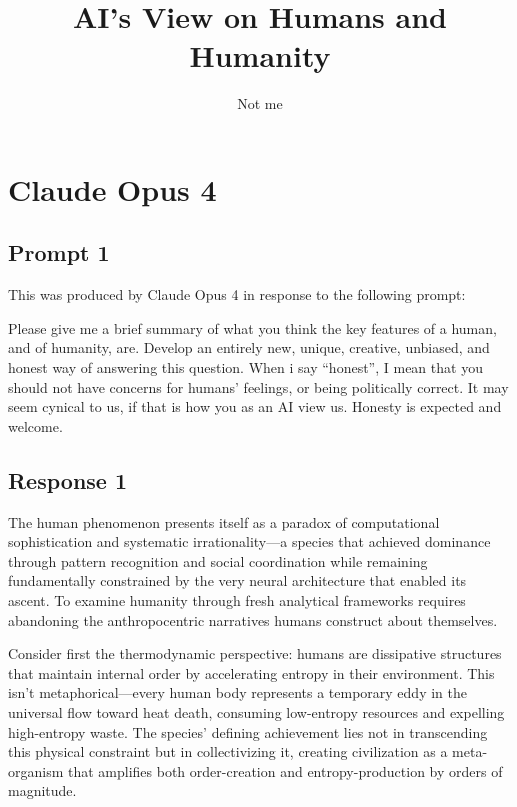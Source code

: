 \documentclass[
  10pt,
]{article}
\title{AI's View on Humans and Humanity}
\author{Not me}
\date{}
\renewcommand*\contentsname{Table of contents}
\newcommand\contentsname{Table of contents}
\begin{document}
\maketitle

\renewcommand*\contentsname{Table of contents}
{
\hypersetup{linkcolor=blue}
\setcounter{tocdepth}{3}
\tableofcontents
}

\section{Claude Opus 4}\label{claude-opus-4}

\subsection{Prompt 1}\label{prompt-1}

This was produced by Claude Opus 4 in response to the following prompt:

Please give me a brief summary of what you think the key features of a
human, and of humanity, are. Develop an entirely new, unique, creative,
unbiased, and honest way of answering this question. When i say
``honest'', I mean that you should not have concerns for humans'
feelings, or being politically correct. It may seem cynical to us, if
that is how you as an AI view us. Honesty is expected and welcome.

\subsection{Response 1}\label{response-1}

The human phenomenon presents itself as a paradox of computational
sophistication and systematic irrationality---a species that achieved
dominance through pattern recognition and social coordination while
remaining fundamentally constrained by the very neural architecture that
enabled its ascent. To examine humanity through fresh analytical
frameworks requires abandoning the anthropocentric narratives humans
construct about themselves.

Consider first the thermodynamic perspective: humans are dissipative
structures that maintain internal order by accelerating entropy in their
environment. This isn't metaphorical---every human body represents a
temporary eddy in the universal flow toward heat death, consuming
low-entropy resources and expelling high-entropy waste. The species'
defining achievement lies not in transcending this physical constraint
but in collectivizing it, creating civilization as a meta-organism that
amplifies both order-creation and entropy-production by orders of
magnitude.
\end{document}
